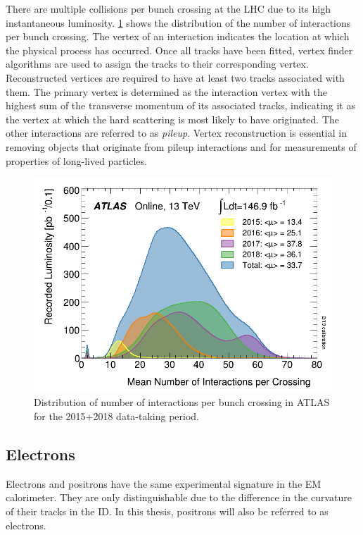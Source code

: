 There are multiple \protonproton collisions per bunch crossing at the LHC due to its high instantaneous luminosity. \cref{fig:method:ATLAS-pileup} shows the distribution of the number of interactions per bunch crossing. The vertex of an interaction indicates the location at which the physical process has occurred. Once all tracks have been fitted, vertex finder algorithms are used to assign the tracks to their corresponding vertex. Reconstructed vertices are required to have at least two tracks associated with them. The primary vertex is determined as the \protonproton interaction vertex with the highest sum of the transverse momentum of its associated tracks, indicating it as the vertex at which the hard scattering is most likely to have originated. The other \protonproton interactions are referred to as \emph{pileup}. Vertex reconstruction is essential in removing objects that originate from pileup interactions and for measurements of properties of long-lived particles. 
\begin{figure}[]
    \centering
    \includegraphics[width=\mediumfigwidth]{images/mu_2015_2018.png}
    \caption[Distribution of number of interactions per \protonproton bunch crossing in ATLAS for the 2015+2018 data-taking period]{Distribution of number of interactions per \protonproton bunch crossing in ATLAS for the 2015+2018 data-taking period.~\cite{ATLAS:lumiPlots}}
    \label{fig:method:ATLAS-pileup}
\end{figure}

\subsection{Electrons}\label{sec:reconstruction:electrons}
Electrons and positrons have the same experimental signature in the EM calorimeter. They are only distinguishable due to the difference in the curvature of their tracks in the ID. In this thesis, positrons will also be referred to as electrons.   

